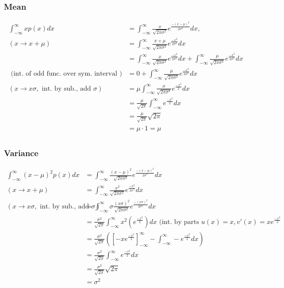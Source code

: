 	\subsubsection*{Mean} %
	\label{ssub:mean}
	

	 \begin{align*} \int_{-\infty}^{\infty}xp(x)dx &= \int_{-\infty}^{\infty}\frac{x}{\sqrt{2\pi\sigma^2}}e^\frac{-(x-\mu)^2}{2\sigma^2}dx,  \\ 
	  (x \to x + \mu) 
	  &= \int_{-\infty}^{\infty}\frac{x+\mu}{\sqrt{2\pi\sigma^2}}e^\frac{-x^2}{2\sigma^2}dx \\ 
	  &= \int_{-\infty}^{\infty}\frac{x}{\sqrt{2\pi\sigma^2}}e^\frac{-x^2}{2\sigma^2}dx + \int_{-\infty}^{\infty}\frac{\mu}{\sqrt{2\pi\sigma^2}}e^\frac{-x^2}{2\sigma^2}dx \\ 
	  \text { (int. of odd func. over sym. interval )} 
	  &= 0 + \int_{-\infty}^{\infty}\frac{\mu}{\sqrt{2\pi\sigma^2}}e^\frac{-x^2}{2\sigma^2}dx \\
	  (x \to x \sigma, \text{ int. by sub., add } \sigma) 
	  &= \mu\int_{-\infty}^{\infty}\frac{\sigma}{\sqrt{2\pi\sigma^2}}e^{\frac{-x^2}{2}}dx \\ 
	  &= \frac{\mu}{\sqrt{2\pi}}\int_{-\infty}^{\infty}e^{\frac{-x^2}{2}}dx \\ 
	  &= \frac{\mu}{\sqrt{2\pi}}\sqrt{2\pi} \\ 
	  &= \mu\cdot1 = \mu \\
	\end{align*}

	\subsubsection*{Variance} %
	\label{ssub:variance}

	\begin{align*}  \int_{-\infty}^{\infty}(x-\mu)^2p(x)dx &=  \int_{-\infty}^{\infty}\frac{(x-\mu)^2}{\sqrt{2\pi\sigma^2}}e^\frac{-(x-\mu)^2}{2\sigma^2}dx \\ (x \to x + \mu) &= 
	\int_{-\infty}^{\infty}\frac{x^2}{\sqrt{2\pi\sigma^2}}e^\frac{-x^2}{2\sigma^2}dx \\ 
	(x \to x \sigma, \text{ int. by sub., add } \sigma)
	&= \int_{-\infty}^{\infty}\sigma\frac{(x\sigma)^2}{\sqrt{2\pi\sigma^2}}e^\frac{-(x\sigma)^2}{2\sigma^2}dx \\
    &= \frac{\sigma^2}{\sqrt{2\pi}}\int_{-\infty}^{\infty}x^2(e^\frac{-x^2}{2})dx \text { (int. by parts } u(x) = x, v'(x) = xe^\frac{-x^2}{2}\\ &=
	\frac{\sigma^2}{\sqrt{2\pi}}([-xe^{\frac{-x^2}{2}}]_{-\infty}^{\infty}-\int_{-\infty}^{\infty}-e^{\frac{-x^2}{2}}dx) \\ &=
	\frac{\sigma^2}{\sqrt{2\pi}}\int_{-\infty}^{\infty}e^{\frac{-x^2}{2}}dx \\ &=
	\frac{\sigma^2}{\sqrt{2\pi}}\sqrt{2\pi} \\ &=
	\sigma^2
	\end{align*} 

